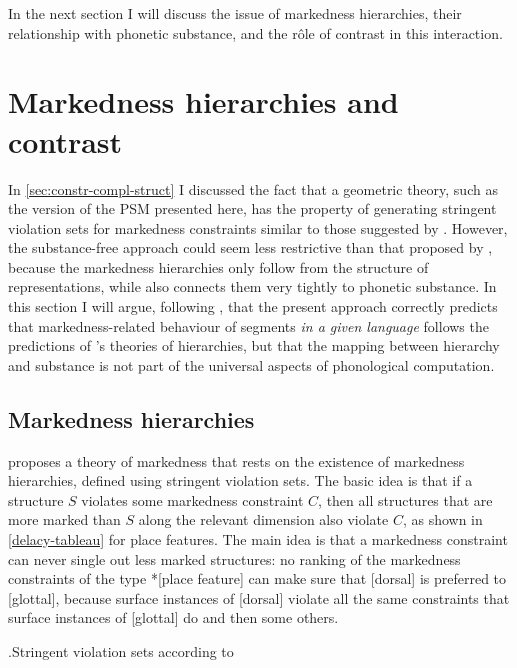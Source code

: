 In the next section I will discuss the issue of markedness hierarchies, their relationship with phonetic substance, and the rôle of contrast in this interaction.

\section{Markedness hierarchies and contrast}
\label{sec:mark-hier-contr}

In \cref{sec:constr-compl-struct} I discussed the fact that a geometric theory, such as the version of the PSM presented here, has the property of generating stringent violation sets for markedness constraints similar to those suggested by \citet{delacy2002,lacy04:_marked_optim_theor,delacy2006}. However, the substance\hyp free approach could seem less restrictive than that proposed by \citet[\emph{et passim}]{delacy2006}, because the markedness hierarchies only follow from the structure of representations, while \citeauthor{delacy2006} also connects them very tightly to phonetic substance. In this section I will argue, following \citet{rice07:_marked,rice09:_nuanc,rice11:_what}, that the present approach correctly predicts that markedness\hyp related behaviour of segments \emph{in a given language} follows the predictions of \citeauthor{delacy2006}'s theories of hierarchies, but that the mapping between hierarchy and substance is not part of the universal aspects of phonological computation.

\subsection{Markedness hierarchies}
\label{sec:mark-hier}

 proposes a theory of markedness that rests on the existence of markedness hierarchies, defined using stringent violation sets. The basic idea is that if a structure $S$ violates some markedness constraint $C$, then all structures that are more marked than $S$ along the relevant dimension also violate $C$, as shown in \ref{delacy-tableau} for place features. The main idea is that a markedness constraint can never single out less marked structures: no ranking of the markedness constraints of the type *[place feature] can make sure that [dorsal] is preferred to [glottal], because surface instances of [dorsal] violate all the same constraints that surface instances of [glottal] do and then some others.

\ex.\label{delacy-tableau}Stringent violation sets according to \citet{delacy2006}\\
\begin{OTtableau}{4}
  \OTcandrow{[ʔ]}{,,,*}
  \OTcandrow{[t]}{,,*,*}
  \OTcandrow{[p]}{,*,*,*}
  \OTcandrow{[k]}{*,*,*,*}
\end{OTtableau}

